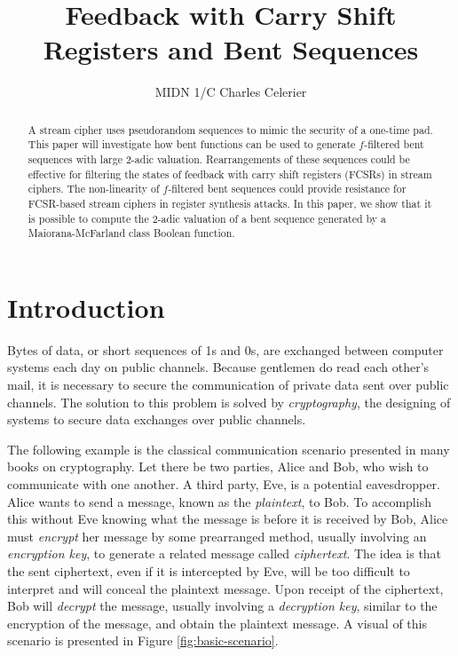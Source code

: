 \documentclass[english]{article}
\theoremstyle{plain}
\theoremstyle{definition}
\theoremstyle{remark}
\begin{document}
\title{Feedback with Carry Shift Registers and Bent Sequences}
\author{MIDN 1/C Charles Celerier}

\maketitle

\begin{abstract}
  A stream cipher uses pseudorandom sequences to mimic the security of a
  one-time pad. This paper will investigate how bent functions can be used
  to generate $f$-filtered bent sequences with large 2-adic valuation.
  Rearrangements of these sequences could be effective for filtering the states
  of feedback with carry shift registers (FCSRs) in stream ciphers. The
  non-linearity of $f$-filtered bent sequences could provide resistance
  for FCSR-based stream ciphers in register synthesis attacks. In this paper, we
  show that it is possible to compute the 2-adic valuation of a bent
  sequence generated by a Maiorana-McFarland class Boolean function.
\end{abstract}

\section{Introduction}\label{sec:intro}
\par Bytes of data, or short sequences of 1s and 0s, are exchanged between
computer systems each day on public channels. Because gentlemen do read each
other's mail, it is necessary to secure the communication of private data
sent over public channels. The solution to this problem is solved by
{\em cryptography}, the designing of systems to secure data exchanges over
public channels.

\par The following example is the classical communication scenario presented
in many books on cryptography. Let there be two parties, Alice and Bob, who
wish to communicate with one another. A third party, Eve, is a potential
eavesdropper. Alice wants to send a message, known as the {\em plaintext},
to Bob. To accomplish this without Eve knowing what the message is before it
is received by Bob, Alice must {\em encrypt} her message by some prearranged
method, usually involving an {\em encryption key}, to generate a related
message called {\em ciphertext}. The idea is that the sent ciphertext, even
if it is intercepted by Eve, will be too difficult to interpret and will
conceal the plaintext message. Upon receipt of the ciphertext, Bob will
{\em decrypt} the message, usually involving a {\em decryption key}, similar
to the encryption of the message, and obtain the plaintext message. A visual
of this scenario is presented in Figure \ref{fig:basic-scenario}.
\end{document}
